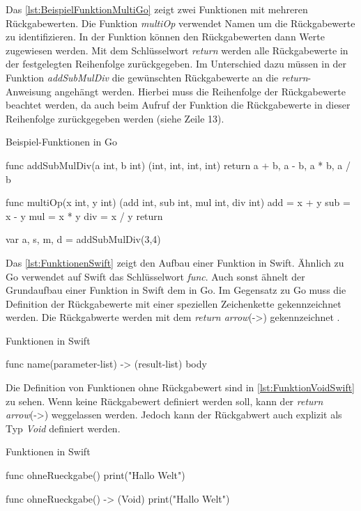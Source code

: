 Das \autoref{lst:BeispielFunktionMultiGo} zeigt zwei Funktionen mit mehreren Rückgabewerten.
Die Funktion \emph{multiOp} verwendet Namen um die Rückgabewerte zu identifizieren.
In der Funktion können den Rückgabewerten dann Werte zugewiesen werden.
Mit dem Schlüsselwort \emph{return} werden alle Rückgabewerte in der festgelegten Reihenfolge zurückgegeben.
Im Unterschied dazu müssen in der Funktion \emph{addSubMulDiv} die gewünschten Rückgabewerte an die \emph{return}-Anweisung angehängt werden.
Hierbei muss die Reihenfolge der Rückgabewerte beachtet werden, da auch beim Aufruf der Funktion die Rückgabewerte in dieser Reihenfolge zurückgegeben werden (siehe Zeile 13). 

\begin{listing}
\caption{Beispiel-Funktionen in Go}
\label{lst:BeispielFunktionMultiGo}
\begin{GoCode}
func addSubMulDiv(a int, b int) (int, int, int, int){
    return a + b, a - b, a * b, a / b
}

func multiOp(x int, y int) (add int, sub int, mul int, div int){
    add = x + y
    sub = x - y
    mul = x * y
    div = x / y
    return
}

var a, s, m, d = addSubMulDiv(3,4)
\end{GoCode}
\end{listing}

Das \autoref{lst:FunktionenSwift} zeigt den Aufbau einer Funktion in Swift. 
Ähnlich zu Go verwendet auf Swift das Schlüsselwort \emph{func}.
Auch sonst ähnelt der Grundaufbau einer Funktion in Swift dem in Go.
Im Gegensatz zu Go muss die Definition der Rückgabewerte mit einer speziellen Zeichenkette gekennzeichnet werden.
Die Rückgabwerte werden mit dem \emph{return arrow}(->) gekennzeichnet \cite{Apple.2017}.

\begin{listing}
\caption{Funktionen in Swift}
\label{lst:FunktionenSwift}
\begin{SwiftCode}
func name(parameter-list) -> (result-list){
    body
}
\end{SwiftCode}
\end{listing}

Die Definition von Funktionen ohne Rückgabewert sind in \autoref{lst:FunktionVoidSwift} zu sehen.
Wenn keine Rückgabewert definiert werden soll, kann der \emph{return arrow}(->) weggelassen werden.
Jedoch kann der Rückgabwert auch explizit als Typ \emph{Void} definiert werden.

\begin{listing}[H]
\caption{Funktionen in Swift}
\label{lst:FunktionVoidSwift}
\begin{SwiftCode}
func ohneRueckgabe() {
    print("Hallo Welt")
}

func ohneRueckgabe() -> (Void) {
    print("Hallo Welt")
}
\end{SwiftCode}
\end{listing}

